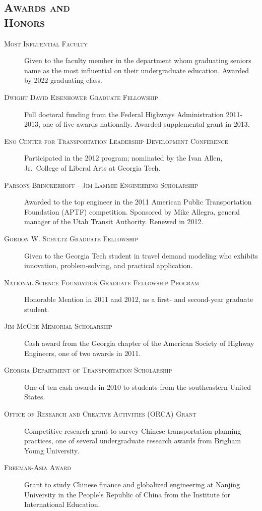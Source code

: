 \documentclass[margin,line]{res}
\newcommand{\secfont}{\scshape }
\newcommand{\acc}{\scshape }
\begin{document}
\begin{resume}
\noindent\makebox[\linewidth]{\rule{\linewidth}{0.4pt}}
\section{\secfont Awards and\\ Honors}
\begin{description}
\item[\acc Most Influential Faculty] Given to the faculty member in the department
whom graduating seniors name as the most influential on their undergraduate
education. Awarded by 2022 graduating class.
\item[\acc Dwight David Eisenhower Graduate Fellowship] Full doctoral funding from
the Federal Highways Administration 2011-2013, one of five awards nationally.
Awarded supplemental grant in 2013.
\item[\acc Eno Center for Transportation Leadership Development Conference]
Participated in the 2012 program; nominated by the Ivan Allen, Jr.\ College of
Liberal Arts at Georgia Tech.
\item[\acc Parsons Brinckerhoff - Jim Lammie Engineering Scholarship] Awarded
 to the top engineer in the 2011 American Public Transportation Foundation (APTF)
competition. Sponsored by Mike Allegra, general manager of the Utah Transit
Authority. Renewed in 2012.
\item[\acc Gordon W. Schultz Graduate Fellowship] Given to the Georgia Tech
student in travel demand modeling who exhibits innovation, problem-solving, and
practical application.
\item[\acc National Science Foundation Graduate Fellowship Program] Honorable
Mention in 2011 and 2012, as a first- and second-year graduate student.
\item[\acc Jim McGee Memorial Scholarship] Cash award from the Georgia chapter of the
American Society of Highway Engineers, one of two awards in 2011.
\item[\acc Georgia Department of Transportation Scholarship] One of ten cash awards in
2010 to students from the southeastern United States.
\item[\acc Office of Research and Creative Activities (ORCA) Grant] Competitive
research grant to survey Chinese transportation planning practices, one of
several undergraduate research awards from Brigham Young University.
\item[\acc Freeman-Asia Award] Grant to study Chinese finance and globalized
engineering at Nanjing University in the People's Republic of China from the
Institute for International Education.
\end{description}


\end{resume}
\end{document}
